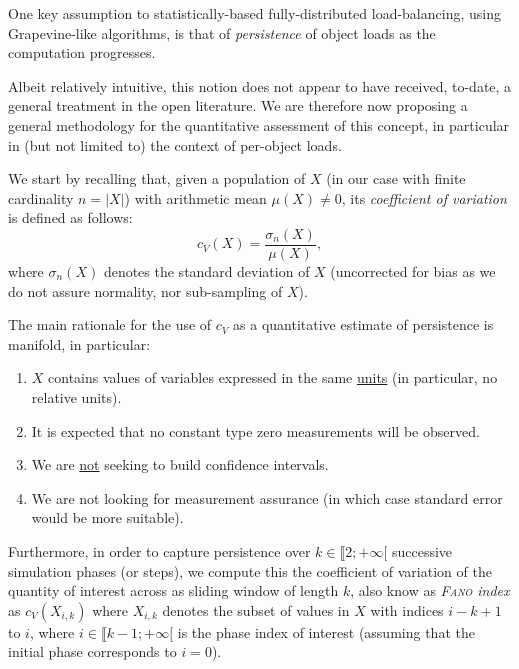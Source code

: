 One key assumption to statistically-based fully-distributed
load-balancing, using Grapevine-like algorithms, is that of
\emph{persistence} of object loads as the computation progresses.

Albeit relatively intuitive, this notion does not appear to have
received, to-date, a general treatment in the open literature.
We are therefore now proposing a general methodology for the
quantitative assessment of this concept, in particular in (but not
limited to) the context of per-object loads.

We start by recalling that,  given a population of $X$ (in our case
with finite cardinality $n=\lvert{X}\rvert$) with arithmetic mean
$\mu(X)\neq0$, its \emph{coefficient of variation} is
defined as follows:
\[
c_V(X) = \frac{\sigma_{n}(X)}{\mu(X)},
\]
where $\sigma_{n}(X)$ denotes the standard deviation of $X$
(uncorrected for bias as we do not assure normality, nor 
sub-sampling of $X$). 

The main rationale for the use of $c_V$ as a quantitative estimate of
persistence is manifold, in particular:
\begin{enumerate}
\item
$X$ contains values of variables expressed in the same \underline{units} (in particular, no relative units).
\item
It is expected that no constant type zero measurements will be observed.
\item
We are \underline{not} seeking to build confidence intervals.
\item
We are not looking for measurement assurance (in which case standard
error would be more suitable).
\end{enumerate}

Furthermore, in order to capture persistence over
$k\in\llbracket2;+\infty[$ successive simulation phases (or steps), we
compute this the coefficient of variation of the quantity of interest
across as sliding window of length $k$, also know as
\emph{\textsc{Fano} index} as $c_V(X_{i,k})$ where $X_{i,k}$ denotes
the subset of values in $X$ with indices $i-k+1$ to $i$, where
$i\in\llbracket{k-1};+\infty[$ is the phase index of interest
(assuming that the initial phase corresponds to $i=0$).
